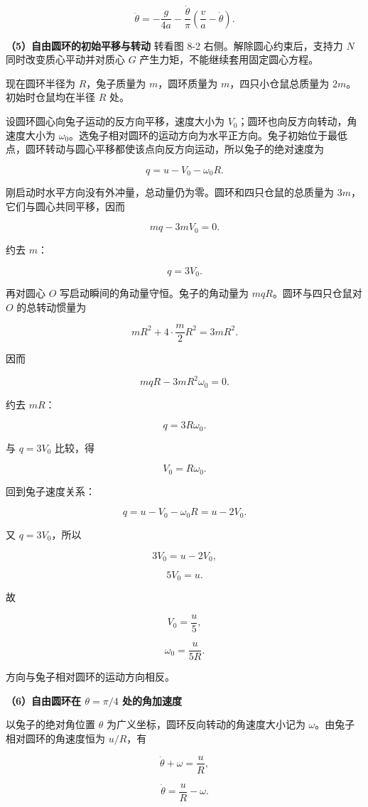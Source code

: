 \documentclass[12pt,a4paper,UTF8]{ctexart}
\begin{document}
\[\boxed{
\ddot\theta
=-\frac g{4a}
-\frac{\dot\theta}{\pi}
\left(\frac va-\dot\theta\right)
}.\]

\textbf{（5）自由圆环的初始平移与转动} 转看图 8-2
右侧。解除圆心约束后，支持力 \(N\) 同时改变质心平动并对质心 \(G\)
产生力矩，不能继续套用固定圆心方程。

现在圆环半径为 \(R\)，兔子质量为 \(m\)，圆环质量为
\(m\)，四只小仓鼠总质量为 \(2m\)。初始时仓鼠均在半径 \(R\) 处。

设圆环圆心向兔子运动的反方向平移，速度大小为
\(V_0\)；圆环也向反方向转动，角速度大小为
\(\omega_0\)。选兔子相对圆环的运动方向为水平正方向。兔子初始位于最低点，圆环转动与圆心平移都使该点向反方向运动，所以兔子的绝对速度为

\[q=u-V_0-\omega_0R.\]

刚启动时水平方向没有外冲量，总动量仍为零。圆环和四只仓鼠的总质量为
\(3m\)，它们与圆心共同平移，因而

\[mq-3mV_0=0.\]

约去 \(m\)：

\[q=3V_0.\]

再对圆心 \(O\) 写启动瞬间的角动量守恒。兔子的角动量为
\(mqR\)。圆环与四只仓鼠对 \(O\) 的总转动惯量为

\[mR^2+4\cdot\frac m2R^2=3mR^2.\]

因而

\[mqR-3mR^2\omega_0=0.\]

约去 \(mR\)：

\[q=3R\omega_0.\]

与 \(q=3V_0\) 比较，得

\[V_0=R\omega_0.\]

回到兔子速度关系：

\[q=u-V_0-\omega_0R=u-2V_0.\]

又 \(q=3V_0\)，所以

\[3V_0=u-2V_0,\]

\[5V_0=u.\]

故

\[V_0=\frac u5,\]

\[\boxed{\omega_0=\frac{u}{5R}}.\]

方向与兔子相对圆环的运动方向相反。

\textbf{（6）自由圆环在 \(\theta=\pi/4\) 处的角加速度}

以兔子的绝对角位置 \(\theta\) 为广义坐标，圆环反向转动的角速度大小记为
\(\omega\)。由兔子相对圆环的角速度恒为 \(u/R\)，有

\[\dot\theta+\omega=\frac uR,\]

\[\dot\theta=\frac uR-\omega.\]
\end{document}
